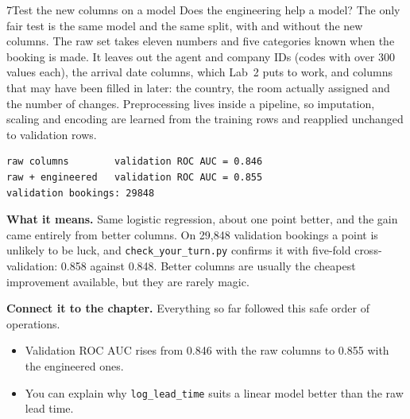 \begin{labquestion}{7}{Test the new columns on a model}
Does the engineering help a model? The only fair test is the same model and the same split, with and without the new columns. The raw set takes eleven numbers and five categories known when the booking is made. It leaves out the agent and company IDs (codes with over 300 values each), the arrival date columns, which Lab~2 puts to work, and columns that may have been filled in later: the country, the room actually assigned and the number of changes. Preprocessing lives inside a pipeline, so imputation, scaling and encoding are learned from the training rows and reapplied unchanged to validation rows.
\end{labquestion}
\begin{labanswer}


\begin{refoutput}
\begin{lstlisting}[style=utpterminal]
raw columns        validation ROC AUC = 0.846
raw + engineered   validation ROC AUC = 0.855
validation bookings: 29848
\end{lstlisting}
\end{refoutput}

\textbf{What it means.} Same logistic regression, about one point better, and the gain came entirely from better columns. On 29,848 validation bookings a point is unlikely to be luck, and \texttt{check\_your\_turn.py} confirms it with five-fold cross-validation: 0.858 against 0.848. Better columns are usually the cheapest improvement available, but they are rarely magic.
\end{labanswer}

\textbf{Connect it to the chapter.} Everything so far followed this safe order of operations.


\begin{labcheckpoint}
\begin{itemize}[leftmargin=1.2em,itemsep=2pt,topsep=1pt]
  \item Validation ROC AUC rises from 0.846 with the raw columns to 0.855 with the engineered ones.
  \item You can explain why \texttt{log\_lead\_time} suits a linear model better than the raw lead time.
\end{itemize}
\end{labcheckpoint}

